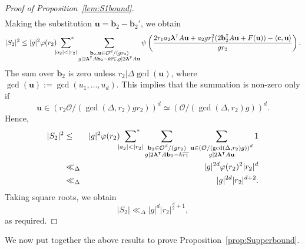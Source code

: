 \documentclass[10pt]{amsart}
\theoremstyle{plain}
\theoremstyle{plain}
\renewcommand{\vec}[1]{\mathbf{#1}}
\theoremstyle{remark}
\theoremstyle{definition}
\newcommand{\sumstar}{\sideset{}{^*}\sum}
\begin{document}
\begin{proof}[Proof of Proposition~\ref{lem:S1bound}]
\begin{eqnarray*}
\end{eqnarray*}
Making the substitution $\vec{u}=\vec{b}_2-\vec{b}_2'$, we obtain
\[|S_2|^2\leq |g|^2\varphi(r_2)\sumstar_{|a_2|<|r_2|}\sum_{\substack{\vec{b}_2,\vec{u}\in \mathcal{O}^d/(gr_2)\\ g|2\boldsymbol{\lambda}^{\intercal}A\vec{b}_2-k\overline{r_1}, g|2\boldsymbol{\lambda}^{\intercal}A\vec{u}}}  \psi\left(\frac{2r_1a_2\boldsymbol{\lambda}^{\intercal}A\vec{u}+a_2gr_1^2(2\vec{b}_2^{\intercal}A\vec{u}+F(\vec{u}))-\left<\vec{c},\vec{u}\right>}{gr_2}\right).\]
The sum over $\vec{b}_2$ is zero unless $r_2|\Delta\gcd(\vec{u})$, where $\gcd(\vec{u}):=\gcd(u_1,\dots,u_d).$ This implies that the summation is non-zero only if
\[\vec{u}\in(r_2\mathcal{O}/(\gcd(\Delta,r_2)gr_2))^d\simeq (\mathcal{O}/(\gcd(\Delta,r_2)g))^d.\]
Hence,
\begin{eqnarray*}|S_2|^2&\leq& |g|^2\varphi(r_2)\sumstar_{|a_2|<|r_2|}\sum_{\substack{\vec{b}_2\in \mathcal{O}^d/(gr_2)\\g|2\boldsymbol{\lambda}^{\intercal}A\vec{b}_2-k\overline{r_1}}}\sum_{\substack{\vec{u}\in (\mathcal{O}/(\gcd(\Delta,r_2)g))^d\\ g|2\boldsymbol{\lambda}^{\intercal}A\vec{u}}}1\\&\ll_{\Delta}& |g|^{2d}\varphi(r_2)^2|r_2|^d\\&\ll_{\Delta}& |g|^{2d}|r_2|^{d+2}.\end{eqnarray*}
Taking square roots, we obtain
\[|S_2|\ll_{\Delta}|g|^{d}|r_2|^{\frac{d}{2}+1},\]
as required.
\end{proof}
We now put together the above results to prove Proposition~\ref{prop:Supperbound}.
\end{document}
